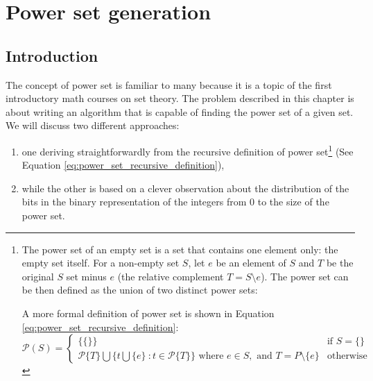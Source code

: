 %


\chapter{Power set generation}
\label{ch:power_set}
\section*{Introduction}
The concept of power set is familiar to many because it is a topic of the first
introductory math courses on set theory. 
The problem described in this chapter is about writing
an algorithm that is capable of finding the power set of a given set. 
We will discuss two different approaches: 
\begin{enumerate}
    \item one deriving straightforwardly  from the recursive definition of
    power set\footnote{The power set of an empty set is a set that contains one element only: the empty set itself. For a non-empty set $S$, let $e$ be an
    element of $S$ and $T$ be the original $S$ set minus $e$ (the relative complement $T=S \setminus e$). The power set can
    be then defined as the union of two distinct power sets: 
    A more formal definition of power set is shown in Equation \ref{eq:power_set_recursive_definition}:
    \begin{equation}
        \mathcal{P}(S)=\begin{cases} 
    \{\{\}\} & \text{if } S=\{\} \\
    \mathcal{P}\{T\} \bigcup \{t \bigcup \{e\} \: : t \in \mathcal{P}\{T\}\} \text{ where } e \in S, \text{ and } T = P \setminus \{e\} & \text{otherwise}
    \end{cases}
    \label{eq:power_set_recursive_definition}
    \end{equation} 
    } (See Equation \ref{eq:power_set_recursive_definition}),
    \item while the other is based on a clever
    observation about the distribution of the bits in the binary representation of the integers from $0$ to the size of the
    power set. 
\end{enumerate}


